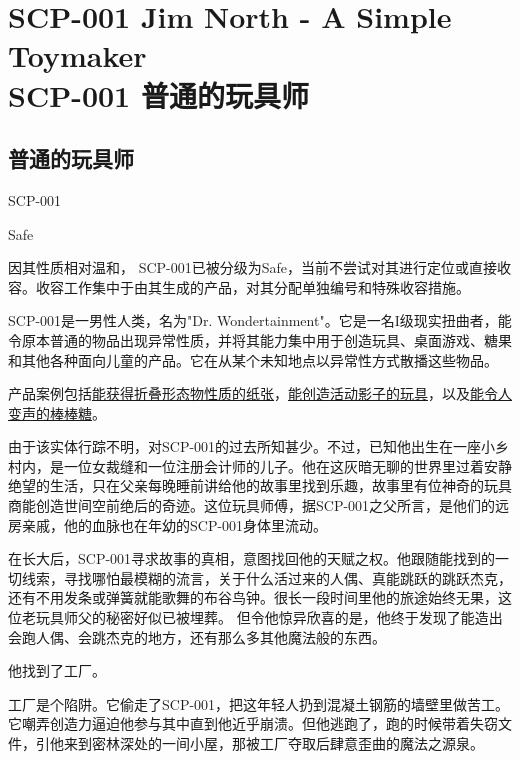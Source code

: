 \chapter[SCP-001 普通的玩具师]{
    SCP-001 Jim North -  A Simple Toymaker\\
    SCP-001 普通的玩具师
}

\label{chap:SCP-001.a.simple.toymaker}

\section{普通的玩具师}

\label{sec:SCP-001.a.simple.toymaker.offset.0}

SCP-001

Safe

因其性质相对温和， SCP-001已被分级为Safe，当前不尝试对其进行定位或直接收容。收容工作集中于由其生成的产品，对其分配单独编号和特殊收容措施。

SCP-001是一男性人类，名为"Dr. Wondertainment"。它是一名I级现实扭曲者，能令原本普通的物品出现异常性质，并将其能力集中用于创造玩具、桌面游戏、糖果和其他各种面向儿童的产品。它在从某个未知地点以异常性方式散播这些物品。

产品案例包括\hyperref[chap:SCP-445]{能获得折叠形态物性质的纸张}，\hyperref[chap:SCP-1553]{能创造活动影子的玩具}，以及\hyperref[chap:SCP-3147]{能令人变声的棒棒糖}。

由于该实体行踪不明，对SCP-001的过去所知甚少。不过，已知他出生在一座小乡村内，是一位女裁缝和一位注册会计师的儿子。他在这灰暗无聊的世界里过着安静绝望的生活，只在父亲每晚睡前讲给他的故事里找到乐趣，故事里有位神奇的玩具商能创造世间空前绝后的奇迹。这位玩具师傅，据SCP-001之父所言，是他们的远房亲戚，他的血脉也在年幼的SCP-001身体里流动。

在长大后，SCP-001寻求故事的真相，意图找回他的天赋之权。他跟随能找到的一切线索，寻找哪怕最模糊的流言，关于什么活过来的人偶、真能跳跃的跳跃杰克，还有不用发条或弹簧就能歌舞的布谷鸟钟。很长一段时间里他的旅途始终无果，这位老玩具师父的秘密好似已被埋葬。 但令他惊异欣喜的是，他终于发现了能造出会跑人偶、会跳杰克的地方，还有那么多其他魔法般的东西。

他找到了工厂。

工厂是个陷阱。它偷走了SCP-001，把这年轻人扔到混凝土钢筋的墙壁里做苦工。它嘲弄创造力逼迫他参与其中直到他近乎崩溃。但他逃跑了，跑的时候带着失窃文件，引他来到密林深处的一间小屋，那被工厂夺取后肆意歪曲的魔法之源泉。

